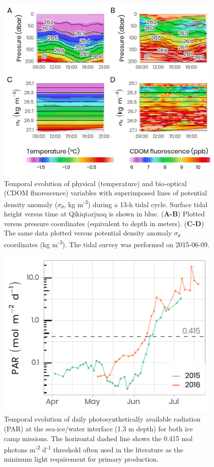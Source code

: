 \documentclass[12pt,a4paper]{scrartcl}
\begin{document}
\begin{figure}[h]
	\centering
	\includegraphics[scale = 1]{../../../graphs/fig04.png}
	\caption{Temporal evolution of physical (temperature) and bio-optical (CDOM fluorescence) variables with superimposed lines of potential density anomaly ($\sigma_\theta$, kg m\textsuperscript{-3}) during a 13-h tidal cycle. Surface tidal height versus time at Qikiqtarjuaq is shown in blue. (\textbf{A-B}) Plotted versus pressure coordinates (equivalent to depth in meters). (\textbf{C-D}) The same data plotted versus potential density anomaly $\sigma_\theta$ coordinates (kg m\textsuperscript{-3}). The tidal survey was performed on 2015-06-09.}
\end{figure}

\begin{figure}[h]
	\centering
	\includegraphics[scale = 1]{../../../graphs/fig05.pdf}
	\caption{Temporal evolution of daily photosynthetically available radiation (PAR) at the sea-ice/water interface (1.3 m depth) for both ice camp missions. The horizontal dashed line shows the 0.415 mol photons m\textsuperscript{-2} d\textsuperscript{-1} threshold often used in the literature as the minimum light requirement for primary production.}
\end{figure}
\end{document}
